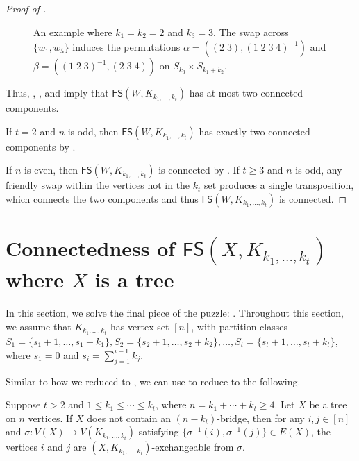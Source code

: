 \documentclass{mystyle}
\newcommand{\FS}{\mathsf{FS}}
\begin{document}
\begin{proof}[Proof of ]
\begin{figure}[ht]
    \caption{An example where $k_1 = k_2 = 2$ and $k_3 = 3$. The swap across $\{w_1, w_{5}\}$ induces the permutations $\alpha = ((2 \; 3), (1 \; 2 \; 3 \; 4)^{-1})$ and $\beta = ((1 \; 2 \; 3)^{-1}, (2 \; 3 \; 4))$ on $S_{k_3} \times S_{k_1 + k_2}$. }
    \label{fig_7}
    \end{figure}

    Thus, , , and  imply that $\FS(W, K_{k_1, \ldots, k_t})$ has at most two connected components. 

    If $t = 2$ and $n$ is odd, then $\FS(W, K_{k_1, \ldots, k_t})$ has exactly two connected components by .
    
    If $n$ is even, then $\FS(W, K_{k_1, \ldots, k_t})$ is connected by . If $t \geq 3$ and $n$ is odd, any friendly swap within the vertices not in the $k_t$ set produces a single transposition, which connects the two components and thus $\FS(W, K_{k_1, \ldots, k_t})$ is connected. 
\end{proof}

\section{Connectedness of $\FS(X, K_{k_1, \ldots, k_t})$ where $X$ is a tree}\label{sec_tree}
In this section, we solve the final piece of the puzzle: . Throughout this section, we assume that $K_{k_1, \ldots, k_t}$ has vertex set $[n]$, with partition classes $S_1 = \{s_1 + 1, \ldots, s_1 + k_1\}, S_2 = \{s_2 + 1, \ldots, s_2 + k_2\}, \ldots, S_t = \{s_{t} + 1, \ldots, s_{t} + k_t\}$, where $s_1 = 0$ and $s_i = \sum_{j = 1}^{i - 1} k_j$.

Similar to how we reduced  to , we can use  to reduce  to the following.

\begin{theorem}\label{thm_tree_reduction}
    Suppose $t > 2$ and $1 \leq k_1 \leq \cdots \leq k_t$, where $n = k_1 + \cdots + k_t \geq 4$. Let $X$ be a tree on $n$ vertices. If $X$ does not contain an $(n - k_t)$-bridge, then for any $i, j \in [n]$ and $\sigma: V(X) \to V(K_{k_1, \ldots, k_t})$ satisfying $\{\sigma^{-1}(i), \sigma^{-1}(j)\} \in E(X)$, the vertices $i$ and $j$ are $(X, K_{k_1, \ldots, k_t})$-exchangeable from $\sigma$. 
\end{theorem}
\end{document}
